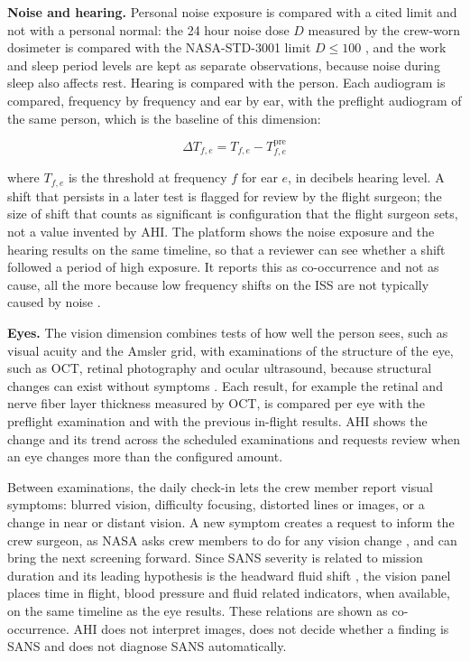 \medskip\noindent\textbf{Noise and hearing.} Personal noise exposure is compared with a cited limit and not with a personal normal: the 24 hour noise dose $D$ measured by the crew-worn dosimeter is compared with the NASA-STD-3001 limit $D\le100$ \cite{nasa_ochmo_tb035_acoustics}, and the work and sleep period levels are kept as separate observations, because noise during sleep also affects rest. Hearing is compared with the person. Each audiogram is compared, frequency by frequency and ear by ear, with the preflight audiogram of the same person, which is the baseline of this dimension:

\begin{equation}
\Delta T_{f,e}=T_{f,e}-T^{\text{pre}}_{f,e}
\end{equation}

where $T_{f,e}$ is the threshold at frequency $f$ for ear $e$, in decibels hearing level. A shift that persists in a later test is flagged for review by the flight surgeon; the size of shift that counts as significant is configuration that the flight surgeon sets, not a value invented by AHI. The platform shows the noise exposure and the hearing results on the same timeline, so that a reviewer can see whether a shift followed a period of high exposure. It reports this as co-occurrence and not as cause, all the more because low frequency shifts on the ISS are not typically caused by noise \cite{coste2024hearing}.

\medskip\noindent\textbf{Eyes.} The vision dimension combines tests of how well the person sees, such as visual acuity and the Amsler grid, with examinations of the structure of the eye, such as OCT, retinal photography and ocular ultrasound, because structural changes can exist without symptoms \cite{brunstetter2023brief}. Each result, for example the retinal and nerve fiber layer thickness measured by OCT, is compared per eye with the preflight examination and with the previous in-flight results. AHI shows the change and its trend across the scheduled examinations and requests review when an eye changes more than the configured amount.

Between examinations, the daily check-in lets the crew member report visual symptoms: blurred vision, difficulty focusing, distorted lines or images, or a change in near or distant vision. A new symptom creates a request to inform the crew surgeon, as NASA asks crew members to do for any vision change \cite{brunstetter2023brief}, and can bring the next screening forward. Since SANS severity is related to mission duration \cite{brunstetter2023brief} and its leading hypothesis is the headward fluid shift \cite{nasa_fluid_shifts_study}, the vision panel places time in flight, blood pressure and fluid related indicators, when available, on the same timeline as the eye results. These relations are shown as co-occurrence. AHI does not interpret images, does not decide whether a finding is SANS and does not diagnose SANS automatically.

